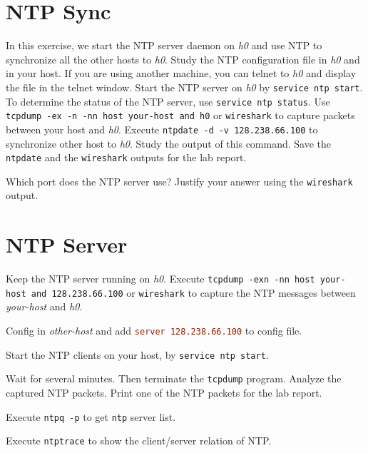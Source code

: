 \documentclass{../UTNetLab}
\begin{document}
\section{NTP Sync}
    In this exercise, we start the NTP server daemon on \textit{h0} and use NTP to
    synchronize all the other hosts to \textit{h0}.
    Study the NTP configuration file  in \textit{h0} and in your host.
    If you are using another machine, you can telnet to \textit{h0} and display the  file in the telnet window.
    Start the NTP server on \textit{h0} by \lstinline{service ntp start}.
    To determine the status of the NTP server, use \lstinline{service ntp status}.
    Use \lstinline[emph={your-host, remote-host, h0}]{tcpdump -ex -n -nn host your-host and h0} or \lstinline{wireshark} to capture packets between your host and \textit{h0}.
    Execute \lstinline{ntpdate -d -v 128.238.66.100} to synchronize other host to \textit{h0}.
    Study the output of this command.
    Save the \lstinline{ntpdate} and the \lstinline{wireshark} outputs for the lab report.
    
    \begin{report}
    \item Which port does the NTP server use?
    Justify your answer using the \lstinline{wireshark} output.
    \end{report}

\section{NTP Server}
    Keep the NTP server running on \textit{h0}. Execute \lstinline[emph={your-host, remote-host}]{tcpdump -exn -nn host your-host and 128.238.66.100} or \lstinline{wireshark} to capture the NTP messages between \textit{your-host} and \textit{h0}.

    Config  in \textit{other-host} and add \lstinline[language={conf}]{server 128.238.66.100} to config file.

    Start the NTP clients on your host, by \lstinline{service ntp start}.

    Wait for several minutes. Then terminate the \lstinline{tcpdump} program. Analyze the captured NTP packets. Print one of the NTP packets for the lab report.

    Execute \lstinline{ntpq -p} to get \lstinline{ntp} server list.

    Execute \lstinline{ntptrace} to show the client/server relation of NTP.
\end{document}
